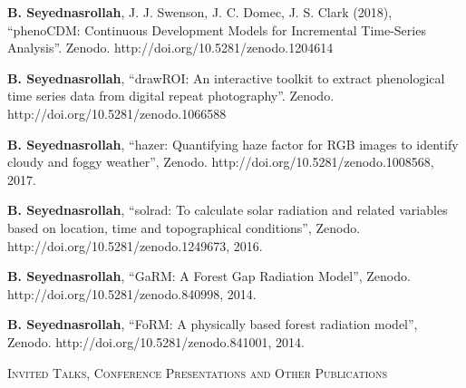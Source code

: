 \documentclass[10pt]{article}
\newenvironment{changemargin}[2]{%
  \begin{list}{}{%
 \setlength{\topsep}{0pt}%
 \setlength{\leftmargin}{#1}%
 \setlength{\rightmargin}{#2}%
 \setlength{\listparindent}{\parindent}%
 \setlength{\itemindent}{\parindent}%
 \setlength{\parsep}{\parskip}%
  }%
  \item[]}{\end{list}
}
\newcommand{\lineover}{
  \begin{changemargin}{-0.05in}{-0.05in}
  \vspace*{-8pt}
  \hrulefill \\
  \vspace*{-2pt}
  \end{changemargin}
}
\newcommand{\header}[1]{
  \begin{changemargin}{-0.5in}{-0.5in}
  \scshape{#1}\\
  \lineover
  \end{changemargin}
}
\newenvironment{body} {
  \vspace*{-2pt}
  \begin{changemargin}{-0.5in}{-0.5in}
}
{\end{changemargin}
}
\begin{document}
\begin{body}
\begin{etaremune}
    \item \textbf{B. Seyednasrollah}, J. J. Swenson, J. C. Domec, J. S. Clark (2018),  ``phenoCDM: Continuous Development Models for Incremental Time-Series Analysis''. Zenodo. http://doi.org/10.5281/zenodo.1204614\\
    \medskip

    \item \textbf{B. Seyednasrollah},  ``drawROI: An interactive toolkit to extract phenological time series data from digital repeat photography''. Zenodo. http://doi.org/10.5281/zenodo.1066588\\
    \medskip

    \item \textbf{B. Seyednasrollah}, ``hazer: Quantifying haze factor for RGB images to identify cloudy and foggy weather'', Zenodo. http://doi.org/10.5281/zenodo.1008568, 2017. \\ \medskip

    \item \textbf{B. Seyednasrollah}, ``solrad: To calculate solar radiation and related variables based on location, time and topographical conditions'', Zenodo. http://doi.org/10.5281/zenodo.1249673, 2016. \\
    \medskip

    \item \textbf{B. Seyednasrollah}, ``GaRM: A Forest Gap Radiation Model'', Zenodo. http://doi.org/10.5281/zenodo.840998, 2014. \\
    \medskip

    \item \textbf{B. Seyednasrollah}, ``FoRM: A physically based forest radiation model'', Zenodo. http://doi.org/10.5281/zenodo.841001, 2014. \\
    \medskip

  \end{etaremune}

\end{body}

\medskip



\header{Invited Talks, Conference Presentations and Other Publications}
\end{document}
